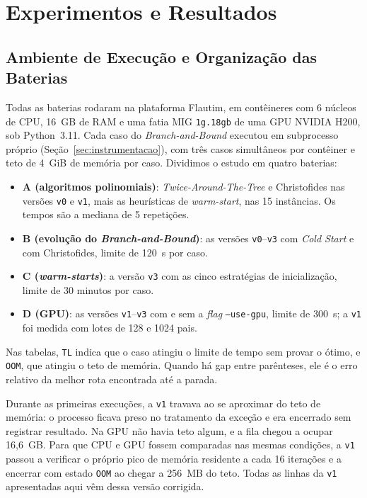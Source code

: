 \section{Experimentos e Resultados}
\label{sec:experimentos}

\subsection{Ambiente de Execução e Organização das Baterias}
\label{sec:ambiente}

Todas as baterias rodaram na plataforma Flautim, em contêineres com 6 núcleos de CPU, 16~GB de
RAM e uma fatia MIG \texttt{1g.18gb} de uma GPU NVIDIA H200, sob Python~3.11. Cada caso do
\textit{Branch-and-Bound} executou em subprocesso próprio (Seção~\ref{sec:instrumentacao}), com
três casos simultâneos por contêiner e teto de 4~GiB de memória por caso. Dividimos o estudo em
quatro baterias:

\begin{itemize}
  \item \textbf{A (algoritmos polinomiais)}: \textit{Twice-Around-The-Tree} e Christofides nas
  versões \texttt{v0} e \texttt{v1}, mais as heurísticas de \textit{warm-start}, nas 15
  instâncias. Os tempos são a mediana de 5 repetições.
  \item \textbf{B (evolução do \textit{Branch-and-Bound})}: as versões \texttt{v0}--\texttt{v3}
  com \textit{Cold Start} e com Christofides, limite de 120~s por caso.
  \item \textbf{C (\textit{warm-starts})}: a versão \texttt{v3} com as cinco estratégias de
  inicialização, limite de 30 minutos por caso.
  \item \textbf{D (GPU)}: as versões \texttt{v1}--\texttt{v3} com e sem a \textit{flag}
  \texttt{--use-gpu}, limite de 300~s; a \texttt{v1} foi medida com lotes de 128 e 1024 pais.
\end{itemize}

Nas tabelas, \texttt{TL} indica que o caso atingiu o limite de tempo sem provar o ótimo, e
\texttt{OOM}, que atingiu o teto de memória. Quando há gap entre parênteses, ele é o erro
relativo da melhor rota encontrada até a parada.

Durante as primeiras execuções, a \texttt{v1} travava ao se aproximar do teto de memória: o
processo ficava preso no tratamento da exceção e era encerrado sem registrar resultado. Na GPU
não havia teto algum, e a fila chegou a ocupar 16,6~GB. Para que CPU e GPU fossem comparadas
nas mesmas condições, a \texttt{v1} passou a verificar o próprio pico de memória residente a
cada 16 iterações e a encerrar com estado \texttt{OOM} ao chegar a 256~MB do teto. Todas as
linhas da \texttt{v1} apresentadas aqui vêm dessa versão corrigida.

